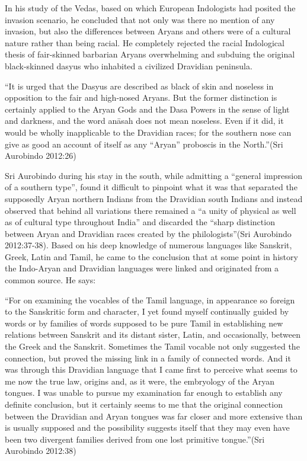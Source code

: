 In his study of the Vedas, based on which European Indologists had posited the invasion scenario, he concluded that not only was there no mention of any invasion, but also the differences between Aryans and others were of a cultural nature rather than being racial. He completely rejected the racial Indological thesis of fair-skinned barbarian Aryans overwhelming and subduing the original black-skinned dasyus who inhabited a civilized Dravidian peninsula.

\begin{myquote}
“It is urged that the Dasyus are described as black of skin and noseless in opposition to the fair and high-nosed Aryans. But the former distinction is certainly applied to the Aryan Gods and the Dasa Powers in the sense of light and darkness, and the word anāsah does not mean noseless. Even if it did, it would be wholly inapplicable to the Dravidian races; for the southern nose can give as good an account of itself as any “Aryan” proboscis in the North.”(Sri Aurobindo 2012:26)
\end{myquote}

Sri Aurobindo during his stay in the south, while admitting a “general impression of a southern type”, found it difficult to pinpoint what it was that separated the supposedly Aryan northern Indians from the Dravidian south Indians and instead observed that behind all variations there remained a “a unity of physical as well as of cultural type throughout India” and discarded the “sharp distinction between Aryan and Dravidian races created by the philologists”(Sri Aurobindo 2012:37-38). Based on his deep knowledge of numerous languages like Sanskrit, Greek, Latin and Tamil, he came to the conclusion that at some point in history the Indo-Aryan and Dravidian languages were linked and originated from a common source. He says:

\begin{myquote}
“For on examining the vocables of the Tamil language, in appearance so foreign to the Sanskritic form and character, I yet found myself continually guided by words or by families of words supposed to be pure Tamil in establishing new relations between Sanskrit and its distant sister, Latin, and occasionally, between the Greek and the Sanskrit. Sometimes the Tamil vocable not only suggested the connection, but proved the missing link in a family of connected words. And it was through this Dravidian language that I came first to perceive what seems to me now the true law, origins and, as it were, the embryology of the Aryan tongues. I was unable to pursue my examination far enough to establish any definite conclusion, but it certainly seems to me that the original connection between the Dravidian and Aryan tongues was far closer and more extensive than is usually supposed and the possibility suggests itself that they may even have been two divergent families derived from one lost primitive tongue.”(Sri Aurobindo 2012:38)
\end{myquote}


